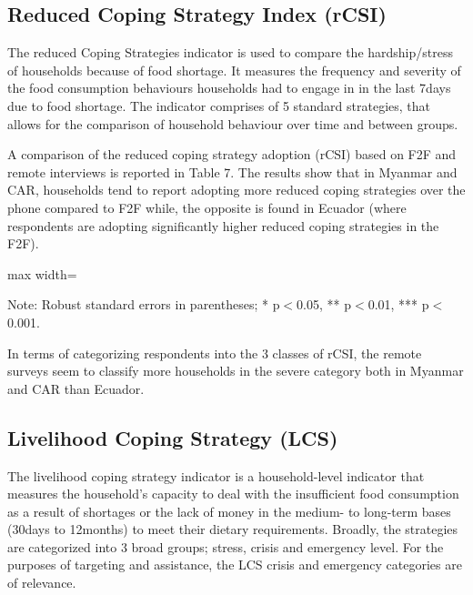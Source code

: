 \documentclass[11pt,harvard]{article}
\begin{document}
		\pagebreak
		
\subsection{Reduced Coping Strategy Index (rCSI)}

The reduced Coping Strategies indicator is used to compare the hardship/stress of households because of food shortage. It measures the frequency and severity of the food consumption behaviours households had to engage in in the last 7days due to food shortage. The indicator comprises of 5 standard strategies, that allows for the comparison of household behaviour over time and between groups.

A comparison of the reduced coping strategy adoption (rCSI) based on F2F and remote interviews is reported in Table 7. The results show that in Myanmar and CAR, households tend to report adopting more reduced coping strategies over the phone compared to F2F while, the opposite is found in Ecuador (where respondents are adopting significantly higher reduced coping strategies in the F2F).

\begin{table}[htbp]
	\centering
	\begin{adjustbox}{max width=\textwidth}
		\begin{threeparttable}
			\caption{Impact of Survey Modality on Reduced Coping Strategy Index Classification}
			\scriptsize
			 
			\label{tab:rCSI_Modality_All_Country}
			\begin{tablenotes}
				\item Note: Robust standard errors in parentheses; * p$<$0.05, ** p$<$0.01, *** p$<$0.001. 
			\end{tablenotes}
		\end{threeparttable}
	\end{adjustbox}
\end{table}

In terms of categorizing respondents into the 3 classes of rCSI, the remote surveys seem to classify more households in the severe category both in Myanmar and CAR than Ecuador.

\pagebreak

\subsection{Livelihood Coping Strategy (LCS)}

The livelihood coping strategy indicator is a household-level indicator that measures the household's capacity to deal with the insufficient food consumption as a result of shortages or the lack of money in the medium- to long-term bases (30days to 12months) to meet their dietary requirements. Broadly, the strategies are categorized into 3 broad groups; stress, crisis and emergency level. For the purposes of targeting and assistance, the LCS crisis and emergency categories are of relevance. 
\end{document}

